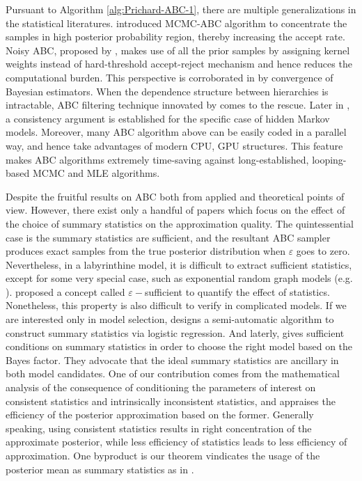Pursuant to Algorithm \ref{alg:Prichard-ABC-1}, there are multiple
generalizations in the statistical literatures. \citet{marjoram2003markov}
{introduced } MCMC-ABC algorithm to concentrate the
samples in high posterior probability region, thereby increasing the
accept rate. Noisy ABC, proposed by \citet{wilkinson2013approximate},
makes use of all the prior samples by assigning kernel weights instead
of hard-threshold accept-reject mechanism and hence reduces the computational
burden. This perspective is corroborated in \citet{fearnhead2012constructing}
by convergence of Bayesian estimators. When the dependence structure
between hierarchies is intractable, ABC filtering technique innovated
by \citet{jasra2012filtering} comes to the rescue. Later in \citet{dean2014parameter},
a consistency argument is established for the specific case of hidden
Markov models. Moreover, many ABC algorithm above can be easily coded
in a parallel way, and hence take advantages of modern CPU, GPU structures.
This feature makes ABC algorithms extremely time-saving against long-established,
looping-based MCMC and MLE algorithms. 

Despite the fruitful results on ABC both from applied and theoretical
points of view. However, there exist only a handful of papers which
focus on the effect of the choice of summary statistics on the approximation
quality. The quintessential case is the summary statistics are sufficient,
and the resultant ABC sampler produces exact samples from the true
posterior distribution when $\varepsilon$ goes to zero. Nevertheless,
in a labyrinthine model, it is difficult to extract sufficient statistics,
except for some very special case, such as exponential random graph
models (e.g. \citet{grelaud2009abc}). \citet{joyce2008approximately}
proposed a concept called $\varepsilon-$sufficient to quantify the
effect of statistics. Nonetheless, this property is also difficult
to verify in complicated models. If we are interested only in model
selection, \citet{prangle2014semi} designs a semi-automatic algorithm
to construct summary statistics via logistic regression. And laterly,
\citet{marin2014relevant} gives sufficient conditions on summary
statistics in order to choose the right model based on the Bayes factor.
They advocate that the ideal summary statistics are ancillary in both
model candidates. One of our contribution comes from the mathematical
analysis of the consequence of conditioning the parameters of interest
on consistent statistics and intrinsically inconsistent statistics,
and appraises the efficiency of the posterior approximation based
on the former. Generally speaking, using consistent statistics results
in right concentration of the approximate posterior, while less efficiency
of statistics leads to less efficiency of approximation. One byproduct
is our theorem vindicates the usage of the posterior mean as summary
statistics as in \citet{fearnhead2012constructing}. 

